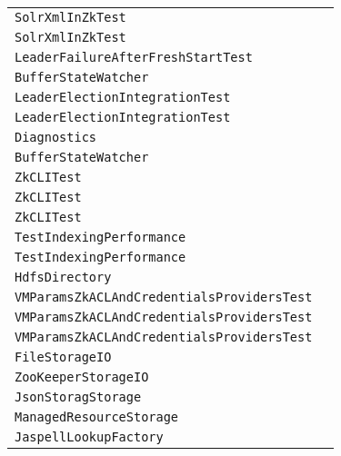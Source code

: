 \begin{center}
\begin{tabular}{ll}
\lstinline/SolrXmlInZkTest/&\raisebox{0pt}{\lstinline/setUpZkAndDiskXml(boolean)/}\\
\lstinline/SolrXmlInZkTest/&\raisebox{0pt}{\lstinline/setUpZkAndDiskXml(boolean)/}\\
\lstinline/LeaderFailureAfterFreshStartTest/&\raisebox{0pt}{\lstinline/waitForNewLeader()/}\\
\lstinline/BufferStateWatcher/&\raisebox{0pt}{\lstinline/process(WatchedEvent)/}\\
\lstinline/LeaderElectionIntegrationTest/&\raisebox{0pt}{\lstinline/setUp()/}\\
\lstinline/LeaderElectionIntegrationTest/&\raisebox{0pt}{\lstinline/setUp()/}\\
\lstinline/Diagnostics/&\raisebox{0pt}{\lstinline/logThreadDumps(String)/}\\
\lstinline/BufferStateWatcher/&\raisebox{0pt}{\lstinline/process(WatchedEvent)/}\\
\lstinline/ZkCLITest/&\raisebox{0pt}{\lstinline/setUp()/}\\
\lstinline/ZkCLITest/&\raisebox{0pt}{\lstinline/setUp()/}\\
\lstinline/ZkCLITest/&\raisebox{0pt}{\lstinline/setUp()/}\\
\lstinline/TestIndexingPerformance/&\raisebox{0pt}{\lstinline/testIndexingPerf()/}\\
\lstinline/TestIndexingPerformance/&\raisebox{0pt}{\lstinline/testIndexingPerf()/}\\
\lstinline/HdfsDirectory/&\raisebox{0pt}{\lstinline/close()/}\\
\lstinline/VMParamsZkACLAndCredentialsProvidersTest/&\raisebox{0pt}{\lstinline/setUp()/}\\
\lstinline/VMParamsZkACLAndCredentialsProvidersTest/&\raisebox{0pt}{\lstinline/setUp()/}\\
\lstinline/VMParamsZkACLAndCredentialsProvidersTest/&\raisebox{0pt}{\lstinline/setUp()/}\\
\lstinline/FileStorageIO/&\raisebox{0pt}{\lstinline/configure(SolrResourceLoader)/}\\
\lstinline/ZooKeeperStorageIO/&\raisebox{0pt}{\lstinline/delete(String)/}\\
\lstinline/JsonStoragStorage/&\raisebox{0pt}{\lstinline/store(String)/}\\
\lstinline/ManagedResourceStorage/&\raisebox{0pt}{\lstinline/Objectload(StringresourceId)/}\\
\lstinline/JaspellLookupFactory/&\raisebox{0pt}{\lstinline/Lookupcreate(NamedList)/}\\

\end{tabular}
\end{center}
